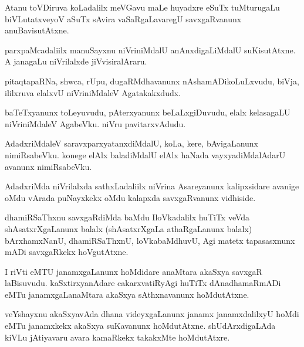 \documentclass{article}
\begin{document}
\begin{mng}%
Atanu toVDiruva koLadalilx meVGavu maLe huyadxre eSuTx
tuMturugaLu biVLutatxveyoV aSuTx sAvira vaSaRgaLavaregU savxgaRvanunx
anuBavisutAtxne.
\end{mng}

\begin{mng}%
parxpaMcadaliilx manuSayxnu niVriniMdalU anAnxdigaLiMdalU suKisutAtxne.
A janagaLu niVrilalxde jiVvisiralAraru.
\end{mng}

\begin{mng}%
pitaqtapaRNa, shwca, rUpu, dugaRMdhavanunx nAshamADikoLuLxvudu,
biVja, ililxruva elalxvU niVriniMdaleV Agatakakxdudx.
\end{mng}

\begin{mng}%
baTeTxyanunx toLeyuvudu, pAterxyanunx beLaLxgiDuvudu, elalx
kelasagaLU niVriniMdaleV AgabeVku. niVru pavitarxvAdudu.
\end{mng}

\begin{mng}%
AdadxriMdaleV saravxparxyatanxdiMdalU, koLa, kere, bAvigaLanunx
nimiRsabeVku. konege elAlx baladiMdalU elAlx haNada vayxyadiMdalAdarU
avanunx nimiRsabeVku.
\end{mng}

\begin{mng}%
AdadxriMda niVrilalxda sathxLadaliilx niVrina Asareyanunx kalipxsidare avanige
oMdu vArada puNayxkekx oMdu kalapxda savxgaRvanunx vidhiside.
\end{mng}

\begin{mng}%
dhamiRSaThxnu savxgaRdiMda baMdu IloVkadalilx huTiTx veVda shAsatxrXgaLanunx
balalx (shAsatxrXgaLa athaRgaLanunx balalx) bArxhamxNanU, dhamiRSaThxnU,
loVkabaMdhuvU, Agi matetx tapasasxnunx mADi savxgaRkekx hoVgutAtxne.
\end{mng}

\begin{mng}%
I riVti eMTU janamxgaLanunx hoMdidare anaMtara akaSxya savxgaR
laBisuvudu. kaSxtirxyanAdare cakarxvatiRyAgi huTiTx dAnadhamaRmADi
eMTu janamxgaLanaMtara akaSxya sAthxnavanunx hoMdutAtxne.
\end{mng}

\begin{mng}%
veYshayxnu akaSxyavAda dhana videyxgaLanunx janamx janamxdalilxyU
hoMdi eMTu janamxkekx akaSxya suKavanunx hoMdutAtxne. shUdArxdigaLAda
kiVLu jAtiyavaru avara kamaRkekx takakxMte hoMdutAtxre.
\end{mng}
\end{document}
